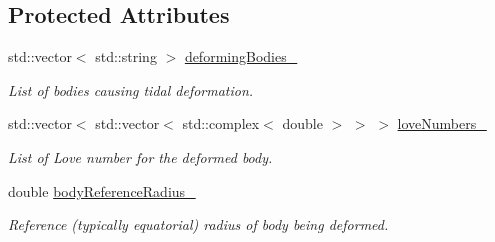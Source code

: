\subsection*{Protected Attributes}
\begin{DoxyCompactItemize}
\item 
std\+::vector$<$ std\+::string $>$ \hyperlink{classtudat_1_1simulation__setup_1_1BasicSolidBodyGravityFieldVariationSettings_a698538439d1b9d1bf280d935b94f4e19}{deforming\+Bodies\+\_\+}\hypertarget{classtudat_1_1simulation__setup_1_1BasicSolidBodyGravityFieldVariationSettings_a698538439d1b9d1bf280d935b94f4e19}{}\label{classtudat_1_1simulation__setup_1_1BasicSolidBodyGravityFieldVariationSettings_a698538439d1b9d1bf280d935b94f4e19}

\begin{DoxyCompactList}\small\item\em List of bodies causing tidal deformation. \end{DoxyCompactList}\item 
std\+::vector$<$ std\+::vector$<$ std\+::complex$<$ double $>$ $>$ $>$ \hyperlink{classtudat_1_1simulation__setup_1_1BasicSolidBodyGravityFieldVariationSettings_aa4d7846c73f4a451ecf328dad7143008}{love\+Numbers\+\_\+}\hypertarget{classtudat_1_1simulation__setup_1_1BasicSolidBodyGravityFieldVariationSettings_aa4d7846c73f4a451ecf328dad7143008}{}\label{classtudat_1_1simulation__setup_1_1BasicSolidBodyGravityFieldVariationSettings_aa4d7846c73f4a451ecf328dad7143008}

\begin{DoxyCompactList}\small\item\em List of Love number for the deformed body. \end{DoxyCompactList}\item 
double \hyperlink{classtudat_1_1simulation__setup_1_1BasicSolidBodyGravityFieldVariationSettings_a7ffd8ccb084f4506edd3a09b899143dc}{body\+Reference\+Radius\+\_\+}\hypertarget{classtudat_1_1simulation__setup_1_1BasicSolidBodyGravityFieldVariationSettings_a7ffd8ccb084f4506edd3a09b899143dc}{}\label{classtudat_1_1simulation__setup_1_1BasicSolidBodyGravityFieldVariationSettings_a7ffd8ccb084f4506edd3a09b899143dc}

\begin{DoxyCompactList}\small\item\em Reference (typically equatorial) radius of body being deformed. \end{DoxyCompactList}\end{DoxyCompactItemize}


